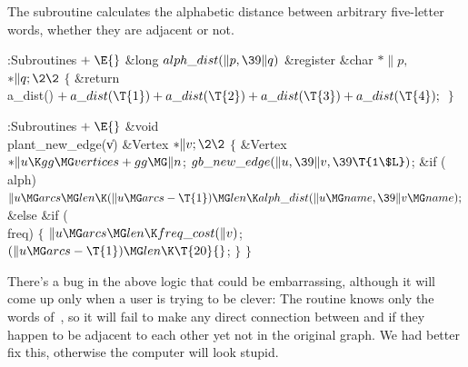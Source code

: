 The  subroutine calculates the alphabetic distance
between
arbitrary five-letter words, whether they are adjacent or not.

\Y\B\4:Subroutines\X${}\mathrel+\E{}$\6
\1\1\&{long} ${}\\{alph\_dist}(\|p,\39\|q){}$\6
\&{register} \&{char} ${}{*}\|p,{}$ ${}{*}\|q;\2\2{}$\6
${}\{{}$\1\6
\&{return} \\{a\_dist}()${}+\\{a\_dist}(\T{1})+\\{a\_dist}(\T{2})+\\{a%
\_dist}(\T{3})+\\{a\_dist}(\T{4});{}$\6
\4${}\}{}$\2\par
\fi

\B{}:Subroutines\X${}\mathrel+\E{}$\6
\1\1\&{void} \\{plant\_new\_edge}(\|v)\6
\&{Vertex} ${}{*}\|v;\2\2{}$\6
${}\{{}$\5
\1\&{Vertex} ${}{*}\|u\K\\{gg}\MG\\{vertices}+\\{gg}\MG\|n{}$;\7
${}\\{gb\_new\_edge}(\|u,\39\|v,\39\T{1\$L}){}$;\6
\&{if} (\\{alph})\1\5
${}\|u\MG\\{arcs}\MG\\{len}\K(\|u\MG\\{arcs}-\T{1})\MG\\{len}\K\\{alph\_dist}(%
\|u\MG\\{name},\39\|v\MG\\{name});{}$\2\6
\&{else} \&{if} (\\{freq})\5
${}\{{}$\1\6
${}\|u\MG\\{arcs}\MG\\{len}\K\\{freq\_cost}(\|v){}$;\6
${}(\|u\MG\\{arcs}-\T{1})\MG\\{len}\K\T{20}{}$;\6
\4${}\}{}$\2\6
\4${}\}{}$\2\par
\fi

There's a bug in the above logic that could be embarrassing,
although it will come up only when a user is trying to be clever: The
 routine knows only the words of~, so it will fail
to
make any direct connection between  and  if they
happen
to be adjacent to each other yet not in the original graph. We had
better fix this, otherwise the computer will look stupid.

